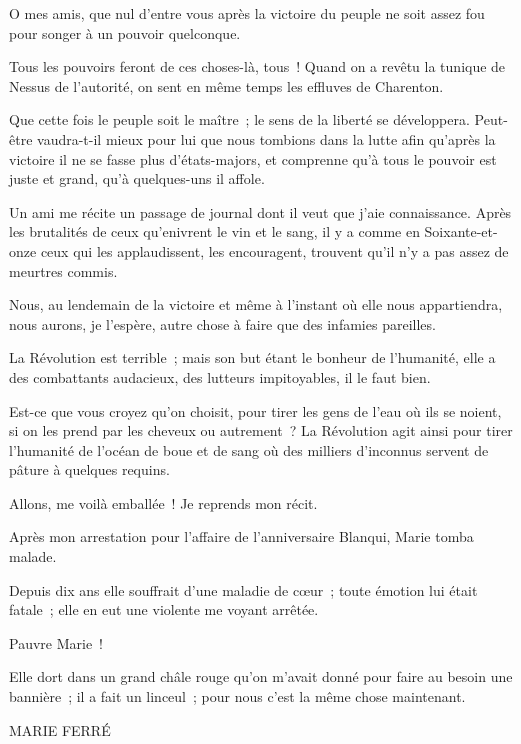 \documentclass[french,twoside]{book} %
\newenvironment{quoteblock}%
  {\begin{quoting}}
  {\end{quoting}}
\newenvironment{quotebar}{%
    \def\FrameCommand{{\color{rubric!10!}\vrule width 0.5em} \hspace{0.9em}}%
    \def\OuterFrameSep{\itemsep} %
    \MakeFramed {\advance\hsize-\width \FrameRestore}
  }%
  {%
    \endMakeFramed
  }
\renewenvironment{quoteblock}%
  {%
    \savenotes
    \setstretch{0.9}
    \normalfont
    \begin{quotebar}
  }
  {%
    \end{quotebar}
    \spewnotes
  }
\begin{document}
O mes amis, que nul d’entre vous après la victoire du peuple ne soit assez fou pour songer à un pouvoir quelconque.\par
Tous les pouvoirs feront de ces choses-là, tous ! Quand on a revêtu la tunique de Nessus de l’autorité, on sent en même temps les effluves de Charenton.\par
Que cette fois le peuple soit le maître ; le sens de la liberté se développera. Peut-être vaudra-t-il mieux pour lui que nous tombions dans la lutte afin qu’après la victoire il ne se fasse plus d’états-majors, et comprenne qu’à tous le pouvoir est juste et grand, qu’à quelques-uns il affole.\par
Un ami me récite un passage de journal dont il veut que j’aie connaissance. Après les brutalités de ceux qu’enivrent le vin et le sang, il y a comme en Soixante-et-onze ceux qui les applaudissent, les encouragent, trouvent qu’il n’y a pas assez de meurtres commis.\par
Nous, au lendemain de la victoire et même à l’instant où elle nous appartiendra, nous aurons, je l’espère, autre chose à faire que des infamies pareilles.\par
La Révolution est terrible ; mais son but étant le bonheur de l’humanité, elle a des combattants  audacieux, des lutteurs impitoyables, il le faut bien.\par
Est-ce que vous croyez qu’on choisit, pour tirer les gens de l’eau où ils se noient, si on les prend par les cheveux ou autrement ? La Révolution agit ainsi pour tirer l’humanité de l’océan de boue et de sang où des milliers d’inconnus servent de pâture à quelques requins.\par
Allons, me voilà emballée ! Je reprends mon récit.\par
Après mon arrestation pour l’affaire de l’anniversaire Blanqui, Marie tomba malade.\par
Depuis dix ans elle souffrait d’une maladie de cœur ; toute émotion lui était fatale ; elle en eut une violente me voyant arrêtée.\par
Pauvre Marie !\par
Elle dort dans un grand châle rouge qu’on m’avait donné pour faire au besoin une bannière ; il a fait un linceul ; pour nous c’est la même chose maintenant.\par

\begin{quoteblock}
MARIE FERRÉ\end{quoteblock}
\end{document}

